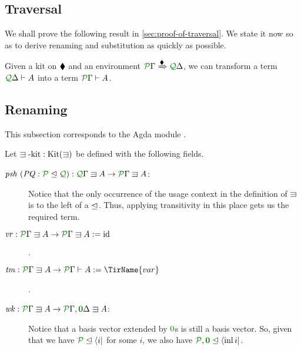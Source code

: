 \documentclass[submission,copyright,creativecommons]{eptcs}
\begin{document}
\subsection{Traversal}

We shall prove the following result in \autoref{sec:proof-of-traversal}.
We state it now so as to derive renaming and substitution as quickly as
possible.

\newcommand{\thmtrav}{%
  Given a kit on $\kitrel$ and an environment
  $\ctx{\Gamma}{P} \subst{\kitrel} \ctx{\Delta}{Q}$, we can transform a term
  $\ctx{\Delta}{Q} \vdash A$ into a term $\ctx{\Gamma}{P} \vdash A$.%
}
\begin{theorem}\label{thm:trav}
  \thmtrav
\end{theorem}

\subsection{Renaming}

This subsection corresponds to the Agda module
.

\begin{definition}\label{def:lvar-kit}
  Let $\lvar\textrm{-kit} : \kit(\lvar)$ be defined with the following
  fields.
  \begin{description}
    \item[$\mathit{psh}~(\mathit{PQ} : \resctx P \subres \resctx Q)
      : \ctx{\Gamma}{Q} \lvar A \to \ctx{\Gamma}{P} \lvar A$:]
      Notice that the only occurrence of the usage context in the definition of
      $\lvar$ is to the left of a $\trianglelefteq$.
      Thus, applying transitivity in this place gets us the required term.
    \item[$\mathit{vr} : \ctx{\Gamma}{P} \lvar A \to \ctx{\Gamma}{P} \lvar A
      := \mathrm{id}$].
    \item[$\mathit{tm} : \ctx{\Gamma}{P} \lvar A \to \ctx{\Gamma}{P} \vdash A
      := \TirName{var}$].
    \item[$\mathit{wk} : \ctx{\Gamma}{P} \lvar A
      \to \ctx{\Gamma}{P}, \ctx{\Delta}{\vct 0} \lvar A$:]
      Notice that a basis vector extended by $\rescomment 0$s is still a basis
      vector.
      So, given that we have $\resctx P \subres \langle i \rvert$ for some $i$,
      we also have
      $\resctx P, \rescomment{\vct 0} \subres \langle \inl i \rvert$.
  \end{description}
\end{definition}
\end{document}
